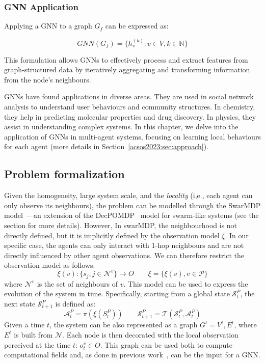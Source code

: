 \subsubsection{GNN Application}

Applying a \ac{GNN} to a graph $G_f$ can be expressed as:

\begin{equation}
\mathit{GNN}(G_f) = \{h_v^{(k)}: v \in V, k \in \mathbb{N}\}
\end{equation} 

This formulation allows \acp{GNN} to effectively process and extract features from graph-structured data by iteratively aggregating and transforming information from the node's neighbours.

\acp{GNN} have found applications in diverse areas. They are used in social network analysis to understand user behaviours and community structures. In chemistry, they help in predicting molecular properties and drug discovery. In physics, they assist in understanding complex systems. In this chapter, we delve into the application of \acp{GNN} in multi-agent systems, focusing on learning local behaviours for each agent (more details in Section~\ref{acsos2023:sec:approach}).

\subsection{Problem formalization}
Given the homogeneity, large system scale, and the \emph{locality} (i,e., each agent can only observe its neighbours), 
 the problem can be modelled through the SwarMDP model~\cite{DBLP:conf/atal/SosicKZK17}---an extension of the \ac{DecPOMDP}~\cite{Decpomdp2000} model for swarm-like systems (see the  section for more details).
% 
However, In swarMDP, the neighbourhood is not directly defined, but it is implicitly defined by the observation model $\xi$.
In our specific case, the agents can only interact with 1-hop neighbours and are not directly influenced by other agent observations. We can therefore restrict the observation model as follows:
\begin{equation*}
\xi(v): \{s_j, j \in \mathcal{N}^v\} \rightarrow O
\qquad
\xi = \{\xi(v), v \in \mathcal{P}\}
\end{equation*}
where $\mathcal{N}^v$ is the set of neighbours of $v$.
%
This model can be used to express the evolution of the system in time.
Specifically, starting from a global state $\mathcal{S}^P_t$, the next state $\mathcal{S}^P_{t+1}$ is defined as:
\begin{equation*}
\mathcal{A}^P_t = \pi(\xi(S^P_t))
\qquad
\mathcal{S}^P_{t+1} = \mathcal{T}(\mathcal{S}^P_t, \mathcal{A}^P_t)
\end{equation*}
Given a time $t$, the system can be also represented as a graph $G^t = {V^t, E^t}$, 
  where $E^t$ is built from $\mathcal{N}$.
  Each node is then decorated with the local observation perceived at the time $t$: $o^v_t \in O$. 
%
This graph can be used both to compute computational fields and, as done in previous work~\cite{DBLP:conf/corl/TolstayaGPP0R19,tolstaya2020learning,DBLP:conf/icra/GosrichMLPYR022}, can be the input for a GNN.
